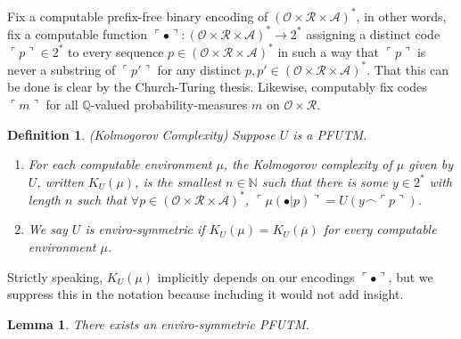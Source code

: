 \documentclass{article}
\newtheorem{definition}[theorem]{Definition}
\newtheorem{lemma}[theorem]{Lemma}
\begin{document}
Fix a computable prefix-free binary encoding of
$(\mathcal O\times \mathcal R\times\mathcal A)^*$, in other words,
fix a computable function
$\ulcorner\bullet\urcorner:(\mathcal O\times \mathcal R\times\mathcal A)^*\to 2^*$
assigning a distinct code $\ulcorner p\urcorner\in 2^*$ to every sequence
$p\in (\mathcal O\times \mathcal R\times\mathcal A)^*$ in such a way that
$\ulcorner p\urcorner$ is never a substring of $\ulcorner p'\urcorner$
for any distinct $p,p'\in (\mathcal O\times \mathcal R\times\mathcal A)^*$.
That this can be done is clear by the Church-Turing thesis.
Likewise, computably fix codes $\ulcorner m\urcorner$ for all
$\mathbb Q$-valued probability-measures $m$ on $\mathcal O\times\mathcal R$.

\begin{definition}
(Kolmogorov Complexity)
Suppose $U$ is a PFUTM.
\begin{enumerate}
    \item
    For each computable environment $\mu$, the \emph{Kolmogorov complexity of $\mu$
    given by $U$}, written $K_U(\mu)$, is the smallest $n\in\mathbb N$ such that
    there is some $y\in 2^*$ with length $n$ such that
    $\forall p\in (\mathcal O\times \mathcal R\times\mathcal A)^*$,
    $\ulcorner\mu(\bullet|p)\urcorner=U(y\frown\ulcorner p\urcorner)$.
    \item
    We say $U$ is \emph{enviro-symmetric} if
    $K_U(\mu)=K_U(\overline\mu)$ for every computable environment $\mu$.
\end{enumerate}
\end{definition}

Strictly speaking, $K_U(\mu)$ implicitly depends on our encodings
$\ulcorner \bullet\urcorner$, but we suppress this in the notation because
including it would not add insight.

\begin{lemma}
\label{envirosymmetricexistencelemma}
    There exists an enviro-symmetric PFUTM.
\end{lemma}
\end{document}
